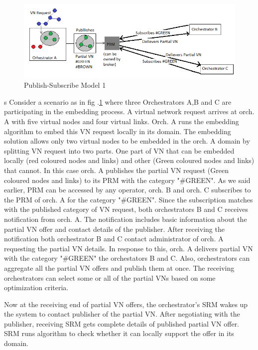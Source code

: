 \documentclass[article,dr=phil,type=msc ,colorback,accentcolor=tud4b]{tudthesis}
\begin{document}
\begin{figure}[h]
	\centering
	\includegraphics[width=\linewidth]{psm1}
	\caption{Publish-Subscribe Model 1}
	\label{pub_sub}
\end{figure}
s
Consider a scenario as in fig .\ref{pub_sub} where three Orchestrators A,B and C are participating in the embedding process. A virtual network request arrives at orch. A with five virtual nodes and four virtual links. Orch. A runs the embedding algorithm to embed this VN request locally in its domain. The embedding solution allows only two virtual nodes to be embedded in the orch. A domain by splitting VN request into two parts. One part of VN that can be embedded locally (red coloured nodes and links) and other (Green coloured nodes  and links) that cannot. In this case orch. A publishes the partial VN request (Green coloured nodes and links) to its PRM with the category "\#GREEN". As we said earlier, PRM can be accessed by any operator, orch. B and orch. C subscribes to the PRM of orch. A for the category "\#GREEN". Since the subscription matches with the published category of VN request, both orchestrators B and C receives notification from orch. A. The notification includes basic information about the partial VN offer and contact details of the publisher. After receiving the notification both orchestrator B and C contact administrator of orch. A requesting the partial VN details. In response to this, orch. A delivers partial VN with the category "\#GREEN"  the orchestators B and C. Also, orchestrators can aggregate all the partial VN offers and publish them at once. The receiving orchestrators can select some or all of the partial VNs based on some optimization criteria.\newline

Now at the receiving end of partial VN offers,  the orchestrator's SRM wakes up the system to contact publisher of the partial VN. After negotiating with the publisher, receiving SRM gets complete details of published partial VN offer. SRM runs algorithm to check whether it can locally support the offer in its domain.
\end{document}
